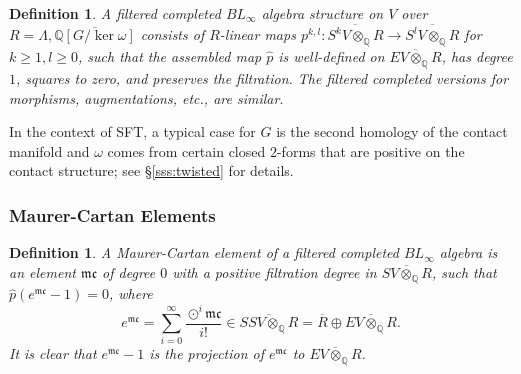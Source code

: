 \documentclass[11pt]{amsart}
\numberwithin{equation}{section}
\newtheorem{definition}[theorem]{\textbf{Definition}}
\def\Q{{\mathbb Q}}
\def\mc{{\mathfrak {mc}}}
\begin{document}
\begin{definition}\label{def:complete}
A filtered completed $BL_\infty$ algebra structure on $V$ over $R=\Lambda,\overline{\Q[G/\ker \omega]}$ consists of $R$-linear maps $p^{k,l}:\overline{S^kV\otimes_{\Q} R} \to \overline{S^lV\otimes_{\Q} R}$
for $k\ge 1, l\ge 0$, such that the assembled map $\widehat{p}$ is well-defined on $\overline{EV\otimes_{\Q} R}$, has degree $1$, squares to zero, and preserves the filtration. The filtered completed versions for morphisms, augmentations, etc., are similar.
\end{definition}

In the context of SFT, a typical case for $G$ is the second homology of the contact manifold and $\omega$ comes from certain closed $2$-forms that are positive on the contact structure; see \S \ref{sss:twisted} for details.


\subsubsection{Maurer-Cartan Elements}\label{ss:MC_Alg}
\begin{definition}
    A Maurer-Cartan element of a filtered completed $BL_\infty$ algebra is an element $\mc$ of degree $0$ with a positive filtration degree in $\overline{SV\otimes_{\Q}R}$, such that $\widehat{p}(e^\mc-1)=0$, where $$e^{\mc}=\sum_{i=0}^{\infty} \frac{\odot^i \mc}{i!} \in \overline{SSV\otimes_{\Q}R}=\overline{R}\oplus \overline{EV\otimes_{\Q}R}.$$ It is clear that $e^\mc-1$ is the projection of $e^{\mc}$ to $\overline{EV\otimes_{\Q}R}$.
\end{definition}
\end{document}
